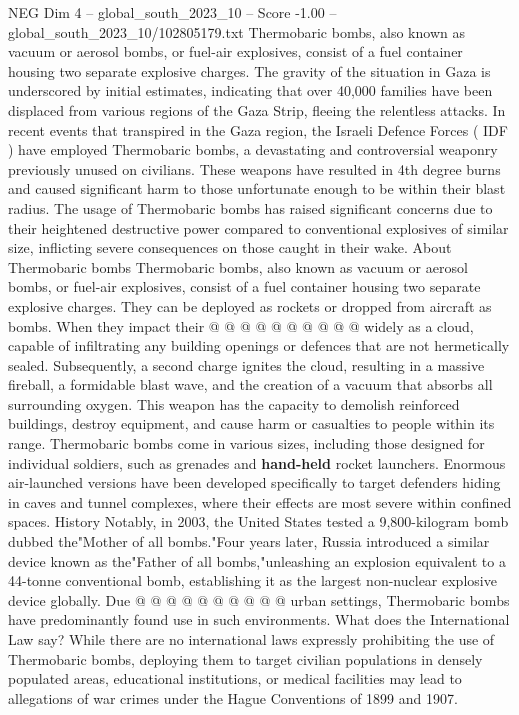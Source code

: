 \begin{textsample}{NEG Dim 4 – global\_south\_2023\_10 – Score -1.00 – global\_south\_2023\_10/102805179.txt}  \label{ex:f4_neg_022}
Thermobaric bombs, also known as vacuum or aerosol bombs, or fuel-air explosives, consist of a fuel container housing two separate explosive charges.
The gravity of the situation in Gaza is underscored by initial estimates, indicating that over 40,000 families have been displaced from various regions of the Gaza Strip, fleeing the relentless attacks.
In recent events that transpired in the Gaza region, the Israeli Defence Forces ( IDF ) have employed Thermobaric bombs, a devastating and controversial weaponry previously unused on civilians.
These weapons have resulted in 4th degree burns and caused significant harm to those unfortunate enough to be within their blast radius.
The usage of Thermobaric bombs has raised significant concerns due to their heightened destructive power compared to conventional explosives of similar size, inflicting severe consequences on those caught in their wake.
About Thermobaric bombs Thermobaric bombs, also known as vacuum or aerosol bombs, or fuel-air explosives, consist of a fuel container housing two separate explosive charges.
They can be deployed as rockets or dropped from aircraft as bombs.
When they impact their @ @ @ @ @ @ @ @ @ @ widely as a cloud, capable of infiltrating any building openings or defences that are not hermetically sealed.
Subsequently, a second charge ignites the cloud, resulting in a massive fireball, a formidable blast wave, and the creation of a vacuum that absorbs all surrounding oxygen.
This weapon has the capacity to demolish reinforced buildings, destroy equipment, and cause harm or casualties to people within its range.
Thermobaric bombs come in various sizes, including those designed for individual soldiers, such as grenades and \textbf{hand-held} rocket launchers.
Enormous air-launched versions have been developed specifically to target defenders hiding in caves and tunnel complexes, where their effects are most severe within confined spaces.
History Notably, in 2003, the United States tested a 9,800-kilogram bomb dubbed the"Mother of all bombs."Four years later, Russia introduced a similar device known as the"Father of all bombs,"unleashing an explosion equivalent to a 44-tonne conventional bomb, establishing it as the largest non-nuclear explosive device globally.
Due @ @ @ @ @ @ @ @ @ @ urban settings, Thermobaric bombs have predominantly found use in such environments.
What does the International Law say?
While there are no international laws expressly prohibiting the use of Thermobaric bombs, deploying them to target civilian populations in densely populated areas, educational institutions, or medical facilities may lead to allegations of war crimes under the Hague Conventions of 1899 and 1907.

\end{textsample}
